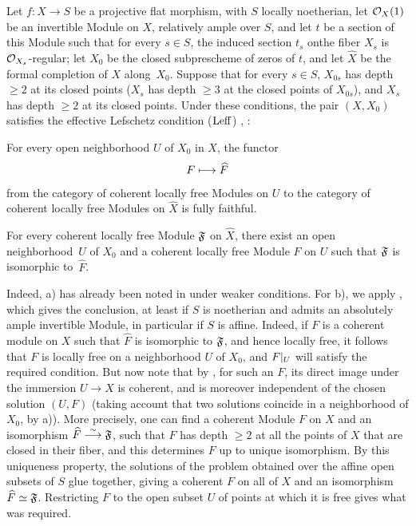 \begin{corollaire} \label{XII.3.4}
Let $f:X\to S$ be a projective flat morphism, with $S$ locally noetherian, let $\OX(1)$ be an invertible Module on $X$, relatively ample over $S$, and let $t$ be a section of this Module such that for every $s\in S$, the induced section $t_s$ on\pageoriginale the fiber $X_s$ is $\Oo_{X_s}$-regular; let $X_0$ be the closed subprescheme of zeros of $t$, and let $\widehat{X}$ be the formal completion of $X$ along~$X_0$. Suppose that for every $s\in S$, $X_{0s}$ has depth $\geq 2$ at its closed points (\ie $X_s$ has depth $\geq 3$ at the closed points of $X_{0s}$), and $X_s$ has depth $\geq 2$ at its closed points. Under these conditions, the pair $(X, X_0)$ satisfies the effective Lefschetz condition ($\Leff$) , \ie:
\begin{enumeratea}
\item
For every open neighborhood $U$ of $X_0$ in $X$, the functor
\[
F \sisi{\rightsquigarrow}{\mto} \widehat{F}
\]
from the category of coherent locally free Modules on $U$ to the category of coherent locally free Modules on $\widehat{X}$ is fully faithful.
\item
For every coherent locally free Module $\formelF$ on $\widehat{X}$, there exist an open neighborhood~$U$ of $X_0$ and a coherent locally free Module $F$ on $U$ such that $\formelF$ is isomorphic to~$\widehat{F}$.
\end{enumeratea}
\end{corollaire}

Indeed, a) has already been noted in  under weaker conditions. For b), we apply , which gives the conclusion, at least if $S$ is noetherian and admits an absolutely ample invertible Module, in particular if $S$ is affine. Indeed, if $F$ is a coherent module on $X$ such that $\widehat{F}$ is isomorphic to $\formelF$, and hence locally free, it follows that $F$ is locally free on a neighborhood $U$ of $X_0$, and $\sisi{F|U}{F|_U}$ will satisfy the required condition. But now note that by , for such an $F$, its direct image under the immersion $U\to X$ is coherent, and is moreover independent of the chosen solution $(U, F)$ (taking account  that two solutions coincide in a neighborhood of $X_0$, by a)). More precisely, one can find a coherent Module $F$ on $X$ and an isomorphism $\widehat{F}\isomto \formelF$, such that $F$ has depth $\geq 2$ at all the points of $X$ that are closed in their fiber, and this determines $F$ up to unique isomorphism. By this uniqueness property, the solutions of the problem obtained over the affine open subsets of $S$ glue together, giving a coherent $F$ on all of $X$ and an isomorphism $\widehat{F}\simeq \formelF$. Restricting $F$ to the open subset $U$ of points at which it is free gives what was required.

